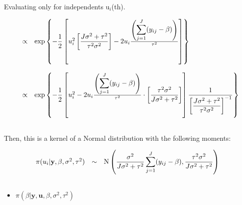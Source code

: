 \documentclass{article}
\begin{document}
Evaluating only for independents u$_i$(th).

\begin{equation*}
\begin{array}{lcl ll }

& \propto &  \mbox{exp}\left\{ -\dfrac{1}{2}\left[ u_i^2 \left[ \dfrac{J\sigma^2 + \tau^2}{\tau^2\sigma^2}\right] - 2u_i\frac{\left(\displaystyle\sum_{j=1}^{J} (y_{ij} - \beta)\right)}{\tau^2}  \right]\right\} \\\\

& \propto &  \mbox{exp}\left\{ -\dfrac{1}{2}\left[ u_i^2 - 2u_i\frac{\left(\displaystyle\sum_{j=1}^{J} (y_{ij} - \beta)\right)}{\tau^2} \cdot \left[ \dfrac{\tau^2\sigma^2}{J\sigma^2 + \tau^2}\right] \right] \dfrac{1}{\left[ \dfrac{J\sigma^2 + \tau^2}{\tau^2\sigma^2}\right]^{-1}}\right\} \\\\

 \end{array}
\end{equation*}

Then, this is a kernel of a Normal distribution with the following moments:

\begin{equation*}
\begin{array}{lcl ll }

\pi(u_i|\textbf{y}, \beta, \sigma^2,\tau^2) & \sim &  \mbox{N}\left( \dfrac{\sigma^2}{J\sigma^2 + \tau^2} \displaystyle\sum_{j=1}^{J} (y_{ij} - \beta) , \dfrac{\tau^2\sigma^2}{J\sigma^2 + \tau^2} \right)  \\\\

 \end{array}
\end{equation*}

\begin{itemize}
\item $\pi(\beta|\textbf{y}, \textbf{u}, \beta, \sigma^2,\tau^2)$
\end{itemize}
\end{document}
